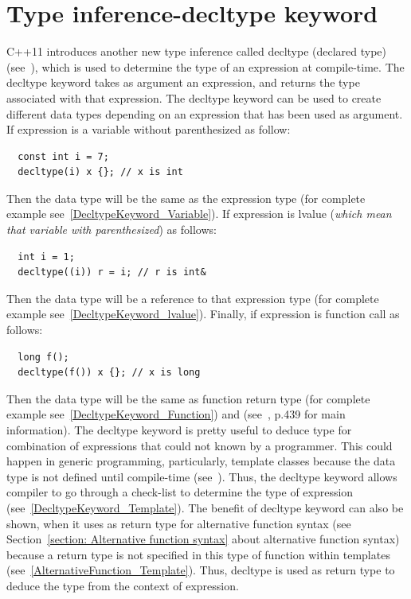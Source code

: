 \documentclass[11pt]{report}
\begin{document}
\section{Type inference-decltype keyword}
\label{section: Decltype keyword}
C++11 introduces another new type inference called decltype (declared type) (see~\cite{Stroustrup:2012:Cpp11}), which is used to determine the type of an expression at compile-time. The decltype keyword takes as argument an expression, and returns the type associated with that expression. The decltype keyword can be used to create different data types depending on an expression that has been used as argument. If expression is a variable without parenthesized as follow:
\begin{lstlisting}
  const int i = 7;
  decltype(i) x {}; // x is int
\end{lstlisting}
Then the data type will be the same as the expression type (for complete example see~\ref{DecltypeKeyword_Variable}). If expression is lvalue (\emph{which mean that variable with parenthesized}) as follows:
\begin{lstlisting}
  int i = 1;
  decltype((i)) r = i; // r is int&
\end{lstlisting}
Then the data type will be a reference to that expression type (for complete example see~\ref{DecltypeKeyword_lvalue}). Finally, if expression is function call as follows:
\begin{lstlisting}
  long f();
  decltype(f()) x {}; // x is long
\end{lstlisting}
Then the data type will be the same as function return type (for complete example see~\ref{DecltypeKeyword_Function}) and (see~\cite{Prata:2012:Cpp}, p.439 for main information). The decltype keyword is pretty useful to deduce type for combination of expressions that could not known by a programmer. This could happen in generic programming, particularly, template classes because the data type is not defined until compile-time (see~\cite{Stroustrup:2012:Cpp11}). Thus, the decltype keyword allows compiler to go through a check-list to determine the type of expression (see~\ref{DecltypeKeyword_Template}). The benefit of decltype keyword can also be shown, when it uses as return type for alternative function syntax (see Section~\ref{section: Alternative function syntax} about alternative function syntax) because a return type is not specified in this type of function within templates (see~\ref{AlternativeFunction_Template}). Thus, decltype is used as return type to deduce the type from the context of expression.
\end{document}
